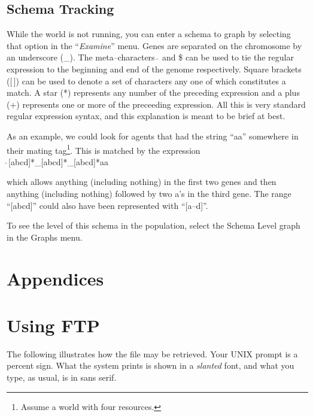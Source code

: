 \subsection{Schema Tracking}
\label{schema-tracking}

While the world is not running, you can enter a schema to graph by
selecting that option in the ``{\sl Examine}''   menu. Genes are separated
on the chromosome by an underscore (\_). The meta--characters
$\hat{\:}$ and
\$ can be used to tie the regular expression  to the beginning and end of the genome
respectively. Square brackets ([\,]) can be used to denote a set of
characters any one of which constitutes a match. A star (*) represents
any number of the preceding expression and a plus (+) represents one
or more of the preceeding expression. All this is very standard
regular expression syntax, and this explanation is meant to be brief
at best.

As an example, we could look for agents that had the string ``aa''
somewhere in their mating tag\footnote{Assume a world with four
resources.}. This is matched by the expression \\
\noindent
$\hat{\:}$[abcd]*\_[abcd]*\_[abcd]*aa

which allows anything (including nothing) in the first two genes and
then anything (including nothing) followed by two a's in the third
gene. The range ``[abcd]'' could also have been represented with
``[a--d]''.

To see the level of this schema in the population, select the Schema
Level graph in the Graphs menu.

\newpage
\section*{Appendices}
\appendix

\section{Using FTP}
\label{using-ftp}

The following illustrates how the file may be retrieved. Your UNIX
prompt is a percent sign. What the system prints is shown in a {\sl
slanted} font, and what you type, as usual, is in {\sf sans serif}.

